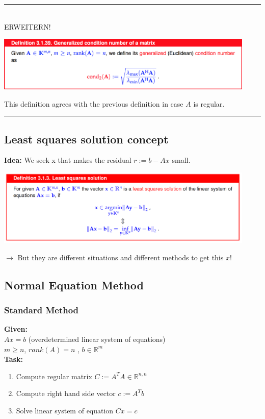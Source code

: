\documentclass[12pt, a4paper]{article}
\newcommand{\R}{\mathbb{R}}
\begin{document}
\rule{40pt}{1pt} \\
ERWEITERN!
\begin{center}
	\includegraphics[width=350pt]{cond.png}
\end{center}

This definition agrees with the previous definition in case $A$ is regular. \\
\rule{40pt}{1pt}



\subsection{Least squares solution concept}

\textbf{Idea:} \quad We seek x that makes the residual $r:=b-Ax$ small.
\begin{center}
	\includegraphics[width=350pt]{leastsquares_solution.png}
\end{center}

$\rightarrow$ But they are different situations and different methods to get this $x$!


\subsection{Normal Equation Method}

\subsubsection{Standard Method}

\begin{tcolorbox}
\textbf{Given:}\\
$Ax = b$ (overdetermined linear system of equations) \\
$m \geq n$, $rank(A)=n$ ,  $b \in \R^{m}$\vspace{2mm}\\
\textbf{Task:} \vspace{-2mm}
\begin{enumerate}[noitemsep]
	\item Compute regular matrix $C := A^TA \in \R^{n,n}$
	\item Compute right hand side vector $c := A^Tb$
	\item Solve linear system of equation $Cx = c$
\end{enumerate}
\end{tcolorbox}
\end{document}
